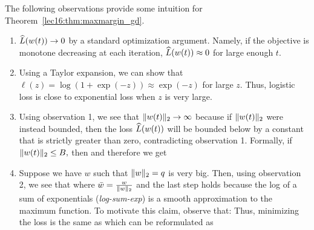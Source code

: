 The following observations provide some intuition for Theorem~\ref{lec16:thm:maxmargin_gd}.
\begin{enumerate}
    \item $\widehat{L}(w(t)) \to 0$ by a standard optimization argument. Namely, if the objective is monotone decreasing at each iteration, $\widehat{L}(w(t)) \approx 0$ for large enough $t$.
    \item Using a Taylor expansion, we can show that $ \ell(z) = \log(1 + \exp(-z)) \approx \exp(-z)$ for large $z$. Thus, logistic loss is close to exponential loss when $z$ is very large.
    \item Using observation 1, we see that $\|w(t)\|_{2} \to \infty$ because if $\|w(t)\|_{2}$ were instead bounded, then the loss $\widehat{L} (w(t))$ will be bounded below by a constant that is strictly greater than zero, contradicting observation 1. Formally, if
    $\|w(t)\|_{2} \leq B,$
    then
    and therefore we get
    \item Suppose we have $w$ such that $\|w\|_{2} = q $ is very big. Then, using observation 2, we see that
    where $ \bar{w} = \frac{w}{\|w\|_{2}}$ and the last step holds because the log of a sum of exponentials (\textit{log-sum-exp}) is a smooth approximation to the maximum function. To motivate this claim, observe that:  
    Thus, minimizing the loss is the same as
    which can be reformulated as

\end{enumerate}

